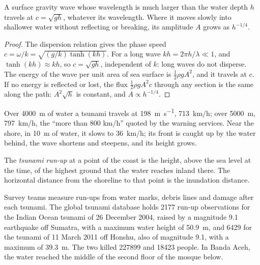 \begin{proposition}\label{prop:b2:geological-hazards:long-waves}
A surface gravity wave whose wavelength is much larger than the water depth $h$ travels at
$c = \sqrt{gh}$, whatever its wavelength. Where it moves slowly into shallower water without
reflecting or breaking, its amplitude $A$ grows as $h^{-1/4}$.
\end{proposition}

\begin{proof}
The dispersion relation gives the phase speed $c = \omega/k = \sqrt{(g/k)\tanh(kh)}$. For a long
wave $kh = 2\pi h/\lambda \ll 1$, and $\tanh(kh) \approx kh$, so $c = \sqrt{gh}$, independent of
$k$: long waves do not disperse. The energy of the wave per unit area of sea surface is $\frac12
\rho g A^2$, and it travels at $c$. If no energy is reflected or lost, the flux $\frac12\rho g A^2
c$ through any section is the same along the path: $A^2 \sqrt{h}$ is constant, and $A \propto
h^{-1/4}$.
\end{proof}

Over \qty{4000}{m} of water a tsunami travels at \qty{198}{m.s^{-1}}, \qty{713}{km/h}; over
\qty{5000}{m}, \qty{797}{km/h}, the ``more than 800 km/h'' quoted by the warning services. Near the
shore, in \qty{10}{m} of water, it slows to \qty{36}{km/h}; its front is caught up by the water
behind, the wave shortens and steepens, and its height grows.

\begin{definition}\label{def:b2:geological-hazards:tsunami}
The \emph{tsunami run-up} at a point of the coast is the height, above the
sea level at the time, of the highest ground that the water reaches inland there. The horizontal
distance from the shoreline to that point is the inundation distance.
\end{definition}

Survey teams measure run-ups from water marks, debris lines and damage after each tsunami. The
global tsunami database holds \num{2177} run-up observations for the Indian Ocean tsunami of
26 December 2004, raised by a magnitude 9.1 earthquake off Sumatra, with a maximum water height of
\qty{50.9}{m}, and \num{6429} for the tsunami of 11 March 2011 off Honshu, also of magnitude 9.1,
with a maximum of \qty{39.3}{m}. The two killed \num{227899} and \num{18423} people. In Banda Aceh,
the water reached the middle of the second floor of the mosque below.

